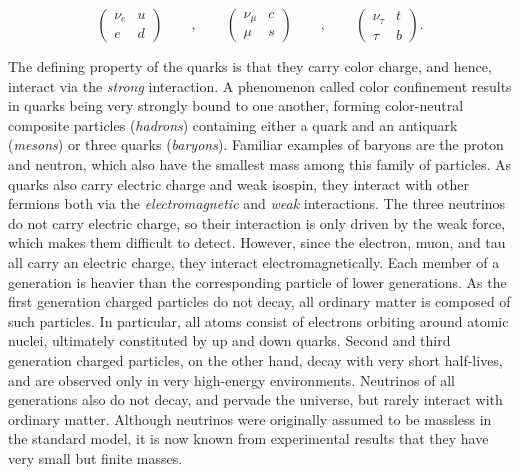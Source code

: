 \[
\begin{pmatrix}
  \nu_e & u \\ e & d
\end{pmatrix}
\qquad
,
\qquad
\begin{pmatrix}
  \nu_\mu & c \\ \mu & s
\end{pmatrix}
\qquad
,
\qquad
\begin{pmatrix}
  \nu_\tau & t \\ \tau & b
\end{pmatrix}.
\]

The defining property of the quarks is that they carry color charge, and hence, interact via the \textit{strong} interaction.
A phenomenon called color confinement results in quarks being very strongly bound to one another, forming color-neutral composite particles (\textit{hadrons})
containing either a quark and an antiquark (\textit{mesons}) or three quarks (\textit{baryons}).
Familiar examples of baryons are the proton and neutron, which also have the smallest mass among this family of particles.
As quarks also carry electric charge and weak isospin, they interact with other fermions both via the \textit{electromagnetic} and \textit{weak} interactions.
The three neutrinos do not carry electric charge, so their interaction is only driven by the weak force, which makes them difficult to detect.
However, since the electron, muon, and tau all carry an electric charge, they interact electromagnetically.
Each member of a generation is heavier than the corresponding particle of lower generations.
As the first generation charged particles do not decay, all ordinary matter is composed of such particles.
In particular, all atoms consist of electrons orbiting around atomic nuclei, ultimately constituted by up and down quarks.
Second and third generation charged particles, on the other hand, decay with very short half-lives, and are observed only in very high-energy environments.
Neutrinos of all generations also do not decay, and pervade the universe, but rarely interact with ordinary matter.
Although neutrinos were originally assumed to be massless in the standard model, it is now known from experimental results that they have very small but finite masses.

